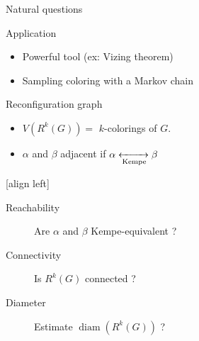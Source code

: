 \documentclass[11pt,xcolor=dvipsnames,presentation]{beamer}
\DeclareMathOperator{\diam}{diam}
\begin{document}
\begin{frame}{Natural questions}
    \begin{block}{Application}
    \begin{itemize}
    \item Powerful tool (ex: Vizing theorem)
    \item Sampling coloring with a Markov chain
    \end{itemize}
  \end{block}

  \begin{exampleblock}{Reconfiguration graph}
    \begin{itemize}
    \item $V(R^k(G)) =$ $k$-colorings of $G$.
    \item $\alpha$ and $\beta$ adjacent  if $\alpha
      \xleftrightarrow[\text{Kempe}]{} \beta$
    \end{itemize}
  \end{exampleblock}
  [align left] 
  \begin{description}
  \item[Reachability] Are $\alpha$ and $\beta$ Kempe-equivalent ? 
  \item[Connectivity] Is $R^k(G)$ connected ?
  \item[Diameter] Estimate $\diam(R^k(G))$ ?
  \end{description}
\end{frame}
\end{document}
